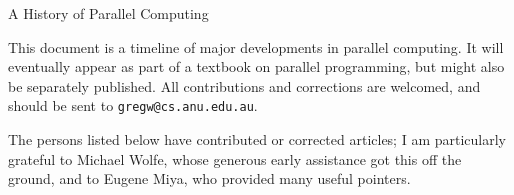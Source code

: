 \def\tllistkeys#1#2{%
\ifthenelse{\equal{#2}{X}}%
{\def\keytemp{#1.}}%
{\def\keytemp{#1, \tllistkeys{#2}}}%
\keytemp}


\newcommand{\chap}[3]{%
\begin{center}\begin{Large}%
{A History of Parallel Computing}%
\end{Large}\end{center}}




\chap{Developments in Parallel Computing}{s:timeline}{timeline}

This document is a timeline of major developments in parallel computing.
It will eventually appear as part of a textbook on parallel programming,
but might also be separately published.
All contributions and corrections are welcomed,
and should be sent to \verb`gregw@cs.anu.edu.au`.

The persons listed below have contributed or corrected articles;
I am particularly grateful to Michael Wolfe,
whose generous early assistance got this off the ground,
and to Eugene Miya,
who provided many useful pointers.

